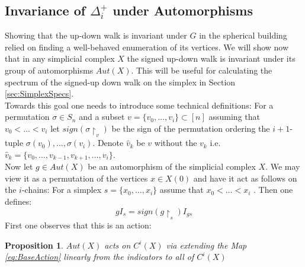 \documentclass[11pt]{amsart}
\newtheorem{proposition}[theorem]{Proposition}
\begin{document}
    \subsection{Invariance of $\Delta_i^+$ under Automorphisms}
    \label{sec:WalkInvariance}
    Showing that the up-down walk is invariant under $G$ in the spherical building relied on finding a well-behaved enumeration of its vertices. We will show now that in any simplicial complex $X$ the signed up-down walk is invariant under its group of automorphisms $Aut(X)$. This will be useful for calculating the spectrum of the signed-up down walk on the simplex in Section \ref{sec:SimplexSpecs}.\\
    Towards this goal one needs to introduce some technical definitions: For a permutation $\sigma \in S_n$ and a subset $v=\{v_0,\dots,v_i\}\subset [n]$ assuming that $v_0<\dots<v_i$ let $sign(\sigma\restriction_v)$ be the sign of the permutation ordering the $i+1$-tuple $\sigma(v_0),\dots, \sigma(v_i)$. Denote $\hat{v}_k$ be $v$ without the $v_k$ i.e. $\hat{v}_k=\{v_0,\dots,v_{k-1},v_{k+1},\dots, v_i\}$. \\
    Now let $g\in Aut(X)$ be an automorphism of the simplicial complex $X$. We may view it as a permutation of the vertices $x\in X(0)$ and have it act as follows on the $i$-chains: For a simplex $s=\{x_0, \dots, x_i\}$ assume that  $x_0<\dots< x_i$ .
    Then one defines:
    \begin{equation}
        gI_s=sign(g\restriction_s)I_{gs}
        \label{eq:BaseAction}
    \end{equation}
    First one observes that this is an action:
    \begin{proposition}
        $Aut(X)$ acts on $C^i(X)$ via extending the Map \ref{eq:BaseAction} linearly from the indicators to all of $C^i(X)$
    \end{proposition}
\end{document}
